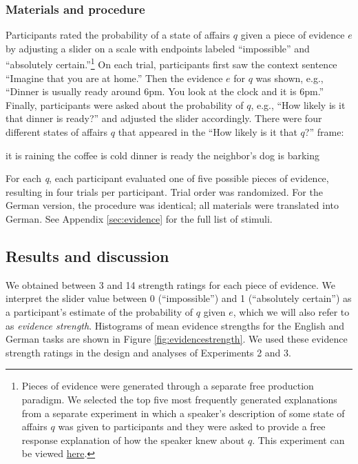 \documentclass[11pt]{article}
\newcommand{\figref}[1]{Figure \ref{#1}}
\newcommand{\appref}[1]{Appendix \ref{#1}}
\begin{document}
\subsubsection{Materials and procedure}

Participants rated the probability of a state of affairs $q$ given a piece of evidence $e$ by adjusting a slider on a scale with endpoints labeled ``impossible'' and ``absolutely certain.''\footnote{Pieces of evidence were generated through a separate free production paradigm. We selected the top five most frequently generated explanations from a separate experiment in which a speaker's description of some state of affairs $q$ was given to participants and they were asked to provide a free response explanation of how the speaker knew about $q$. This experiment can be viewed \href{http://stanford.edu/~jdegen/68_modals_freeproduction/modals.html}{here}.} On each trial, participants first saw the context sentence ``Imagine that you are at home.'' Then the evidence $e$ for $q$ was shown, e.g., ``Dinner is usually ready around 6pm. You look at the clock and it is 6pm.'' Finally, participants were asked about the probability of $q$, e.g., ``How likely is it that dinner is ready?'' and adjusted the slider accordingly. There were four different states of affairs $q$ that appeared in the ``How likely is it that $q$?'' frame:

\begin{exe}
\ex
\begin{xlist}
	\ex it is raining
	\ex the coffee is cold
	\ex dinner is ready
	\ex the neighbor's dog is barking
	\end{xlist}
\end{exe}

For each \emph{q}, each participant evaluated one of five possible pieces of evidence, resulting in four trials per participant. Trial order was randomized. 
For the German version, the procedure was identical; all materials were translated into German. See \appref{sec:evidence} for the full list of stimuli.

\subsection{Results and discussion}

We obtained between 3 and 14 strength ratings for each piece of evidence. We interpret the slider value between 0 (``impossible'') and 1 (``absolutely certain'') as a participant's estimate of the probability of $q$ given $e$, which we will also refer to as  \emph{evidence strength}. Histograms of mean evidence strengths for the English and German tasks are shown in \figref{fig:evidencestrength}.  We used these evidence strength ratings in the design and analyses of Experiments 2 and 3.
\end{document}
